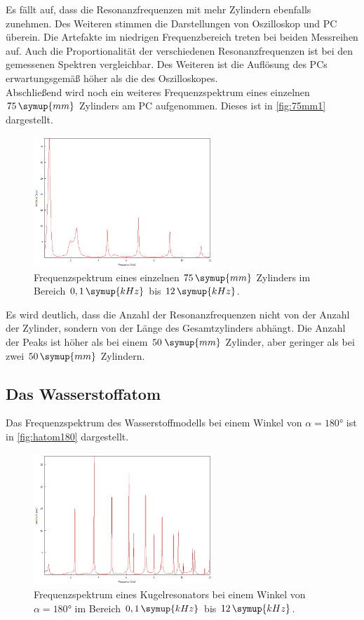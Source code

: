 Es fällt auf, dass die Resonanzfrequenzen mit mehr Zylindern ebenfalls zunehmen. Des Weiteren stimmen die 
Darstellungen von Oszilloskop und PC überein. Die Artefakte im niedrigen Frequenzbereich treten bei beiden
Messreihen auf. Auch die Proportionalität der verschiedenen Resonanzfrequenzen ist bei den gemessenen
Spektren vergleichbar. Des Weiteren ist die Auflösung des PCs erwartungsgemäß höher als die des Oszilloskopes.\\
Abschließend wird noch ein weiteres Frequenzspektrum eines einzelnen $75 \, \symup{mm}$ Zylinders am PC aufgenommen.
Dieses ist in \autoref{fig:75mm1} dargestellt.
\begin{figure}[h]
    \centering
    \includegraphics[width=0.6\textwidth]{data/1_3_zylinder75mm/1.png}
    \caption{Frequenzspektrum eines einzelnen $75 \, \symup{mm}$ Zylinders im Bereich $0,1 \, \symup{kHz}$ bis $12 \, \symup{kHz}$.}
    \label{fig:75mm1}
\end{figure}
Es wird deutlich, dass die Anzahl der Resonanzfrequenzen nicht von der Anzahl der Zylinder, sondern 
von der Länge des Gesamtzylinders abhängt. Die Anzahl der Peaks ist höher als bei einem $50 \; \symup{mm}$ Zylinder,
aber geringer als bei zwei $50 \, \symup{mm}$ Zylindern.

\subsection{Das Wasserstoffatom}
Das Frequenzspektrum des Wasserstoffmodells bei einem Winkel von $\alpha = 180°$ ist in \autoref{fig:hatom180}
dargestellt.
\begin{figure}[h]
    \centering
    \includegraphics[width=0.6\textwidth]{data/2_1/180.png}
    \caption{Frequenzspektrum eines Kugelresonators bei einem Winkel von $\alpha = 180°$ im Bereich $0,1 \, \symup{kHz}$ bis $12 \, \symup{kHz}$.}
    \label{fig:hatom180}
\end{figure}

